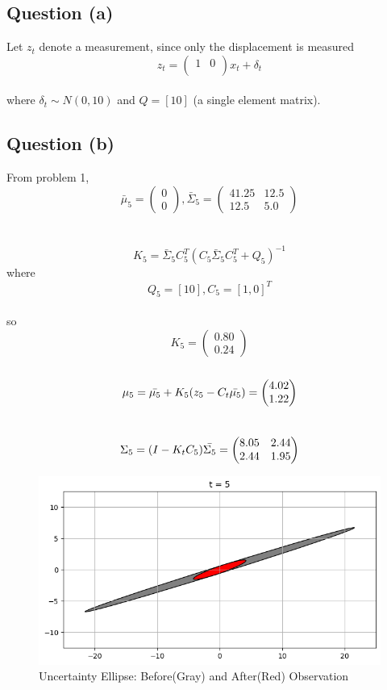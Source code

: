 \documentclass{article}
\begin{document}
\subsection{Question (a)}

Let $z_t$ denote a measurement, since only the displacement is measured\\
$$
z_t = 
\begin{pmatrix}
1 & 0 \\
\end{pmatrix}
x_t + \delta_t
$$
\\
where $\delta_t \sim{N(0,10)}$ and $Q = [10]$ (a single element matrix).
\\
\subsection{Question (b)}
From problem 1,
$$
\bar{\mu}_5 = \begin{pmatrix}
0 \\ 0
\end{pmatrix},
\bar{\Sigma}_5 =\begin{pmatrix}
41.25 & 12.5 \\
12.5  & 5.0
\end{pmatrix}
$$\\
\\
$$
K_5 = \bar{\Sigma}_5 C_5^{T}(C_5\bar{\Sigma}_5 C_5^{T}+Q_5)^{-1}
$$ where $$
Q_5 = [10], C_5 = [1, 0]^T
$$\\
so\\
$$
K_5 = \begin{pmatrix} 
0.80 \\
0.24
\end{pmatrix}
$$\\
$$
\mu_5=\bar{\mu_5}+K_5(z_5-C_t\bar{\mu_5})\\
=\begin{pmatrix}
4.02\\1.22
\end{pmatrix}
$$\\
$$
\Sigma_5 = (I - K_tC_5)\bar{\Sigma_5}\\
=\begin{pmatrix}
8.05 & 2.44 \\
2.44 & 1.95
\end{pmatrix}
$$
\begin{figure}[hbtp]
\centering
\includegraphics[scale=0.7]{./figures/ch3p2.png}
\caption{Uncertainty Ellipse: Before(Gray) and After(Red) Observation}
\label{fig:Uncertainty Ellipse}
\end{figure}
\\
\\
\end{document}

